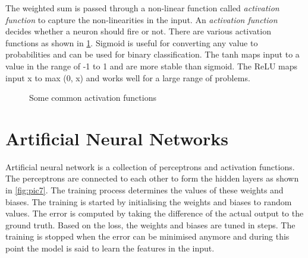 \documentclass[a4paper, 12pt, oneside, BCOR1cm,toc=chapterentrywithdots]{scrbook}
\begin{document}
 The weighted sum is passed through a non-linear function called \textit{activation function} to capture the non-linearities in the input.  An \textit{activation function} decides whether a neuron should fire or not. There are various activation functions as shown in \ref{fig:act}. Sigmoid is useful for converting any value to probabilities and can be used for binary classification. The tanh maps input to a value in the range of -1 to 1 and are more stable than sigmoid. The ReLU maps input x to max (0, x) and works well for a large range of problems.
 
\begin{figure}[h]
\caption{Some common activation functions}
\label{fig:act}
\end{figure}


 

\section{Artificial Neural Networks}

Artificial neural network is a collection of perceptrons and activation functions. The perceptrons are connected to each other to form the hidden layers as shown in \ref{fig:pic7}. The training process determines the values of these weights and biases. The training is started by initialising the weights and biases to random values. The error is computed by taking the difference of the actual output to the ground truth. Based on the loss, the weights and biases are tuned in steps. The training is stopped when the error can be minimised anymore and during this point the model is said to learn the features in the input.
\end{document}
